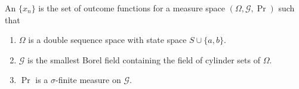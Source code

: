 An  $\{x_n\}$ is the set of outcome functions for a measure space $(\Omega, \mathcal{G}, \Pr)$ such that
\begin{enumerate}
\item $\Omega$ is a double sequence space with state space $S \cup \{a, b\}$.
\item $\mathcal{G}$ is the smallest Borel field containing the field of cylinder sets of $\Omega$.
\item $\Pr$ is a $\sigma$-finite measure on $\mathcal{G}$.
\end{enumerate}
